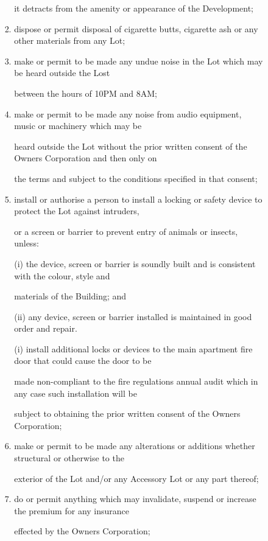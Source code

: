 \documentclass{article}
\begin{document}
\begin{enumerate}[label=\arabic*.]
\begin{enumerate}[label=\arabic{enumi}.\arabic*.]
\begin{enumerate}[label=(\arabic*)]
\begin{enumerate}[label=(\alph*)]
it detracts from the amenity or appearance of the Development; 

\item  dispose or permit disposal of cigarette butts, cigarette ash or any other materials from any Lot; 

\item  make or permit to be made any undue noise in the Lot which may be heard outside the Lost 

between the hours of 10PM and 8AM; 

\item  make or permit to be made any noise from audio equipment, music or machinery which may be 

heard outside the Lot without the prior written consent of the Owners Corporation and then only on 

the terms and subject to the conditions specified in that consent; 

\item  install or authorise a person to install a locking or safety device to protect the Lot against intruders, 

or a screen or barrier to prevent entry of animals or insects, unless: 

(i) the device, screen or barrier is soundly built and is consistent with the colour, style and 

materials of the Building; and 

(ii) any device, screen or barrier installed is maintained in good order and repair. 

(i) install additional locks or devices to the main apartment fire door that could cause the door to be 

made non-compliant to the fire regulations annual audit which in any case such installation will be 

subject to obtaining the prior written consent of the Owners Corporation; 

\item  make or permit to be made any alterations or additions whether structural or otherwise to the 

exterior of the Lot and/or any Accessory Lot or any part thereof; 

\item  do or permit anything which may invalidate, suspend or increase the premium for any insurance 

effected by the Owners Corporation; 

\newpage


\end{enumerate}
\end{enumerate}
\end{enumerate}
\end{enumerate}
\end{document}
